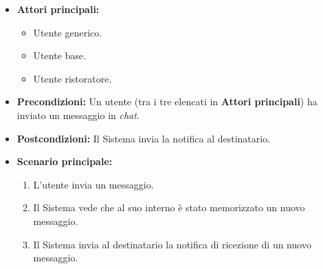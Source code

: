 \label{usecase:Notifica chat}
\begin{itemize}
    \item \textbf{Attori principali:} 
	\begin{itemize}
        \item Utente generico.
        \item Utente base.
        \item Utente ristoratore.
    \end{itemize}
	
	\item \textbf{Precondizioni:}  Un utente (tra i tre elencati in \textbf{Attori principali}) ha inviato un messaggio in \textit{chat}.

	\item \textbf{Postcondizioni:} Il Sistema invia la notifica al destinatario.
     
	\item \textbf{Scenario principale:}
	      \begin{enumerate}
                \item L'utente invia un messaggio.
                \item Il Sistema vede che al suo interno è stato memorizzato un nuovo messaggio.
                \item Il Sistema invia al destinatario la notifica di ricezione di un nuovo messaggio.
	      \end{enumerate}
\end{itemize}